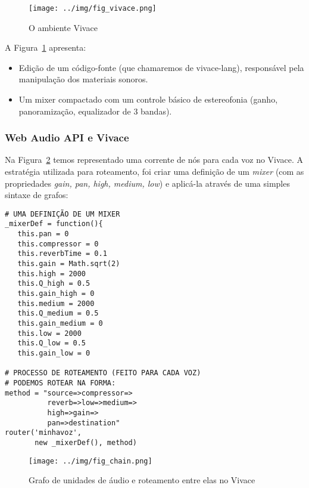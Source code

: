 \documentclass
  [ams,pdfout]%
        {aesbr}
\begin{document}
\begin{figure}[htpb]
  \begin{center}
    \texttt{[image: ../img/fig\_vivace.png]}
    \caption{O ambiente Vivace}
    \label{figure:vivace}
  \end{center}
\end{figure}

A Figura~\ref{figure:vivace} apresenta:

\begin{itemize}
    \item Edição de um código-fonte (que chamaremos de vivace-lang),
      responsável pela manipulação dos materiais sonoros.
    \item Um mixer compactado com um controle básico de estereofonia
      (ganho, panoramização, equalizador de 3 bandas).
\end{itemize}

\subsubsection{Web Audio API e Vivace}

Na Figura~\ref{figure:graph} temos representado uma corrente de nós
para cada voz no Vivace. A estratégia utilizada para roteamento, foi
criar uma definição de um \emph{mixer} (com as propriedades
\emph{gain, pan, high, medium, low}) e aplicá-la através de uma
simples sintaxe de grafos:

\begingroup
    \fontsize{8pt}{9pt}\selectfont
\begin{verbatim}
# UMA DEFINIÇÃO DE UM MIXER
_mixerDef = function(){
   this.pan = 0
   this.compressor = 0
   this.reverbTime = 0.1
   this.gain = Math.sqrt(2)
   this.high = 2000
   this.Q_high = 0.5
   this.gain_high = 0
   this.medium = 2000
   this.Q_medium = 0.5
   this.gain_medium = 0
   this.low = 2000
   this.Q_low = 0.5
   this.gain_low = 0

# PROCESSO DE ROTEAMENTO (FEITO PARA CADA VOZ)
# PODEMOS ROTEAR NA FORMA: 
method = "source=>compressor=>
          reverb=>low=>medium=>
          high=>gain=>
          pan=>destination"
router('minhavoz', 
       new _mixerDef(), method)
\end{verbatim}
\endgroup

\begin{figure}[htpb]
  \begin{center}
    \texttt{[image: ../img/fig\_chain.png]}
    \caption{Grafo de unidades de áudio e roteamento entre elas no Vivace}
    \label{figure:graph}
  \end{center}
\end{figure}
\end{document}
